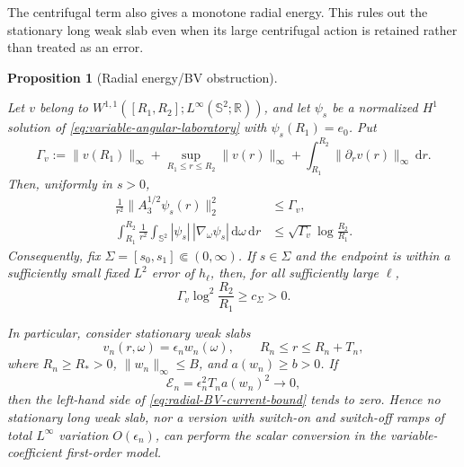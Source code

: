 \documentclass[11pt]{article}
\newcommand{\dd}{\,\mathrm d}
\newtheorem{proposition}[theorem]{Proposition}
\theoremstyle{definition}
\theoremstyle{remark}
\begin{document}
The centrifugal term also gives a monotone radial energy.  This rules out the
stationary long weak slab even when its large centrifugal action is retained
rather than treated as an error.

\begin{proposition}[Radial energy/BV obstruction]
\label{prop:radial-energy-BV-obstruction}
\leavevmode\par\noindent
Let $v$ belong to
$W^{1,1}([R_1,R_2];L^\infty(\mathbb S^2;\mathbb R))$, and let
$\psi_s$ be a normalized $H^1$ solution of
\eqref{eq:variable-angular-laboratory} with $\psi_s(R_1)=e_0$.  Put
\begin{equation}
 \Gamma_v
 :=\|v(R_1)\|_\infty
   +\sup_{R_1\leq r\leq R_2}\|v(r)\|_\infty
   +\int_{R_1}^{R_2}\|\partial_rv(r)\|_\infty\dd r.
 \label{eq:radial-potential-variation}
\end{equation}
Then, uniformly in $s>0$,
\begin{align}
 \frac1{r^2}\|A_3^{1/2}\psi_s(r)\|_2^2
 &\leq \Gamma_v,
 \label{eq:radial-energy-bound}\\
 \int_{R_1}^{R_2}\frac1{r^2}
 \int_{\mathbb S^2}|\psi_s|\,|\nabla_\omega\psi_s|
 \dd\omega\dd r
 &\leq \sqrt{\Gamma_v}\log\frac{R_2}{R_1}.
 \label{eq:radial-BV-current-bound}
\end{align}
Consequently, fix
$\Sigma=[s_0,s_1]\Subset(0,\infty)$.  If $s\in\Sigma$ and the endpoint is
within a sufficiently small fixed $L^2$ error of $h_\ell$, then, for all
sufficiently large $\ell$,
\begin{equation}
 \Gamma_v\log^2\frac{R_2}{R_1}\geq c_\Sigma>0.
 \label{eq:radial-BV-conversion-toll}
\end{equation}

In particular, consider stationary weak slabs
\begin{equation}
 v_n(r,\omega)=\epsilon_nw_n(\omega),
 \qquad R_n\leq r\leq R_n+T_n,
 \label{eq:stationary-weak-angular-slab}
\end{equation}
where $R_n\geq R_*>0$,
$\|w_n\|_\infty\leq B$, and $a(w_n)\geq b>0$.  If
\begin{equation}
 \mathcal E_n=\epsilon_n^2T_na(w_n)^2\longrightarrow0,
 \label{eq:stationary-weak-slab-cost}
\end{equation}
then the left-hand side of
\eqref{eq:radial-BV-current-bound} tends to zero.  Hence no stationary long
weak slab, nor a version with switch-on and switch-off ramps of total
$L^\infty$ variation $O(\epsilon_n)$, can perform the scalar conversion in the
variable-coefficient first-order model.
\end{proposition}
\end{document}
